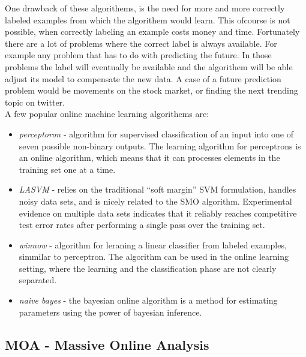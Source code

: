 \documentclass[journal]{IEEEtran/IEEEtran}
\begin{document}
One drawback of these algorithems, is the need for more and more correctly labeled examples from which the algorithem would learn. This ofcourse is not possible, when correctly labeling an example costs money and time. Fortunately there are a lot of problems where the correct label is always available. For example any problem that has to do with predicting the future. In those problems the label will eventually be available and the algorithem will be able adjust its model to compensate the new data. A case of a future prediction problem would be movements on the stock market, or finding the next trending topic on twitter. \\

A few popular online machine learning algorithems are:\\
\begin{itemize}
    \item \textit{perceptoron} - algorithm for supervised classification of an input into one of seven possible non-binary outputs. The learning algorithm for perceptrons is an online algorithm, which means that it can processes elements in the training set one at a time.\\
    \item \textit{LASVM} - relies on the traditional “soft margin” SVM formulation, handles noisy data sets, and is nicely related to the SMO algorithm. Experimental evidence on multiple data sets indicates that it reliably reaches competitive test error rates after performing a single pass over the training set.\\
    \item \textit{winnow} - algorithm for leraning a linear classifier from labeled examples, simmilar to perceptron. The algorithm can be used in the online learning setting, where the learning and the classification phase are not clearly separated.\\
    \item \textit{naive bayes} - the bayesian online algorithm is a method for estimating parameters using the power of bayesian inference.\\
\end{itemize}



\subsection{MOA - Massive Online Analysis}
\end{document}
